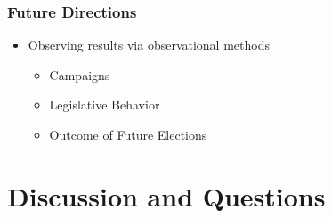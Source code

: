 \documentclass[14pt]{beamer}
\begin{document}
\begin{frame}
\frametitle{Future Directions}
\begin{itemize}
	\item Observing results via observational methods 
	\begin{itemize}
		\item Campaigns
		\item Legislative Behavior
		\item Outcome of Future Elections
	\end{itemize}
\end{itemize}
\end{frame}

\section{Discussion and Questions}
\end{document}
